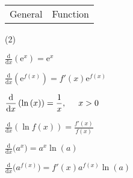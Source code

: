 \documentclass[11pt,a4paper]{book}
\begin{document}
\begin{tcolorbox}[colback=blue!5, colframe=black, boxrule=.4pt, sharpish corners]

\begin{tabular}{>{\centering}p{4.5cm}>{\centering}p{10cm}}
General & Function\tabularnewline
\end{tabular}

\begin{tasks}[style=itemize,label-width=3.5ex](2)

\task  ${\displaystyle \frac{\mathrm{d}}{\mathrm{d}x}\left(\mathrm{e}^{x}\right)=\mathrm{e}^{x}}$

\task  ${\displaystyle \frac{\mathrm{d}}{\mathrm{d}x}\left(\mathrm{e}^{f(x)}\right)=f'(x)\mathrm{e}^{f(x)}}$

\task  ${\displaystyle \frac{\mathrm{d}}{\mathrm{d}x}\left(\ln\left(x\right)\right)=\frac{1}{x},\hspace{0.5cm}x>0}$

\task  ${\displaystyle \frac{\mathrm{d}}{\mathrm{d}x}\left(\ln f\left(x\right)\right)=\frac{f'(x)}{f(x)}}$

\task  ${\displaystyle \frac{\mathrm{d}}{\mathrm{d}x}(}a^{x})=a^{x}\ln(a)$

\task  ${\displaystyle \frac{\mathrm{d}}{\mathrm{d}x}(}a^{f(x)})=f'(x)a^{f(x)}\ln(a)$

\end{tasks}
\end{tcolorbox}
\end{document}
